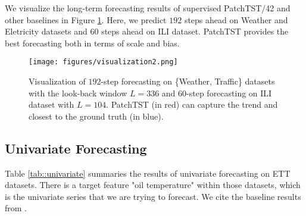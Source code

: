 \documentclass{article} \usepackage{iclr2023_conference,times}
\begin{document}
We visualize the long-term forecasting results of supervised PatchTST/42 and other baselines in Figure \ref{fig::visual}. Here, we predict $192$ steps ahead on Weather and Eletricity datasets and $60$ steps ahead on ILI dataset. PatchTST provides the best forecasting both in terms of scale and bias.

\begin{figure}[!htbp]
\begin{center}
\texttt{[image: figures/visualization2.png]}
\end{center}
\caption{Visualization of $192$-step forecasting on \{Weather, Traffic\} datasets with the look-back window $L=336$ and $60$-step forecasting on ILI dataset with $L=104$. PatchTST (in red) can capture the trend and closest to the ground truth (in blue).}
\label{fig::visual}
\end{figure}

\subsection{Univariate Forecasting}
\label{append:uni}

Table \ref{tab::univariate} summaries the results of univariate forecasting on ETT datasets. There is a target feature "oil temperature" within those datasets, which is the univariate series that we are trying to forecast. We cite the baseline results from \citep{dlinear}.
\end{document}
